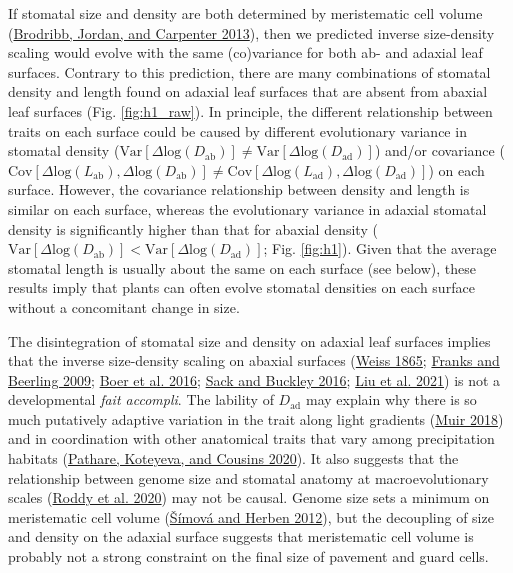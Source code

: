 \documentclass[
  10pt,
]{article}
\begin{document}
If stomatal size and density are both determined by meristematic cell volume (\protect\hyperlink{ref-brodribb_unified_2013}{Brodribb, Jordan, and Carpenter 2013}), then we predicted inverse size-density scaling would evolve with the same (co)variance for both ab- and adaxial leaf surfaces. Contrary to this prediction, there are many combinations of stomatal density and length found on adaxial leaf surfaces that are absent from abaxial leaf surfaces (Fig. \ref{fig:h1_raw}). In principle, the different relationship between traits on each surface could be caused by different evolutionary variance in stomatal density (\(\text{Var}[\Delta \text{log}(D_\text{ab})] \ne \text{Var}[\Delta \text{log}(D_\text{ad})]\)) and/or covariance (\(\text{Cov}[\Delta \text{log}(L_\text{ab}), \Delta \text{log}(D_\text{ab})] \ne \text{Cov}[\Delta \text{log}(L_\text{ad}), \Delta \text{log}(D_\text{ad})]\)) on each surface. However, the covariance relationship between density and length is similar on each surface, whereas the evolutionary variance in adaxial stomatal density is significantly higher than that for abaxial density (\(\text{Var}[\Delta \text{log}(D_\text{ab})] < \text{Var}[\Delta \text{log}(D_\text{ad})]\); Fig. \ref{fig:h1}). Given that the average stomatal length is usually about the same on each surface (see below), these results imply that plants can often evolve stomatal densities on each surface without a concomitant change in size.

The disintegration of stomatal size and density on adaxial leaf surfaces implies that the inverse size-density scaling on abaxial surfaces (\protect\hyperlink{ref-weiss_untersuchungen_1865}{Weiss 1865}; \protect\hyperlink{ref-franks_maximum_2009}{Franks and Beerling 2009}; \protect\hyperlink{ref-de_boer_optimal_2016}{Boer et al. 2016}; \protect\hyperlink{ref-sack_developmental_2016}{Sack and Buckley 2016}; \protect\hyperlink{ref-liu_scaling_2021}{Liu et al. 2021}) is not a developmental \emph{fait accompli}. The lability of \(D_\text{ad}\) may explain why there is so much putatively adaptive variation in the trait along light gradients (\protect\hyperlink{ref-muir_light_2018}{Muir 2018}) and in coordination with other anatomical traits that vary among precipitation habitats (\protect\hyperlink{ref-pathare_increased_2020}{Pathare, Koteyeva, and Cousins 2020}). It also suggests that the relationship between genome size and stomatal anatomy at macroevolutionary scales (\protect\hyperlink{ref-roddy_scaling_2020}{Roddy et al. 2020}) may not be causal. Genome size sets a minimum on meristematic cell volume (\protect\hyperlink{ref-simova_geometrical_2012}{Šímová and Herben 2012}), but the decoupling of size and density on the adaxial surface suggests that meristematic cell volume is probably not a strong constraint on the final size of pavement and guard cells.
\end{document}
